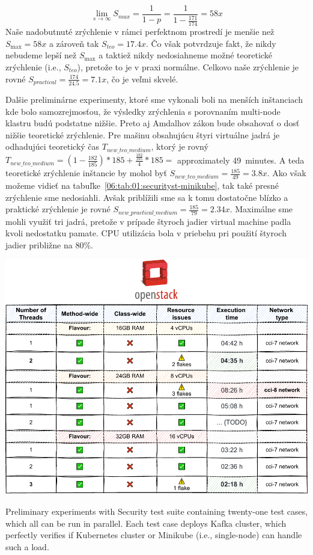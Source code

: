 \begin{equation}
    \label{eqn:amdalh-limit}
    \lim_{s\to\infty} S_{max} = \frac{1}{1-p} =  \frac{1}{1-\frac{171}{174}} = 58x
    \tag{8}
\end{equation}
Naše nadobutnuté zrýchlenie v rámci perfektnom prostredí je menšie než $S_{\max} = 58x$ a zároveň tak $S_{teo} = 17.4x$.
Čo však potvrdzuje fakt, že nikdy nebudeme lepší než $S_{\max}$ a taktiež nikdy nedosiahneme možné teoretické zrýchlenie (i.e., $S_{teo}$),
pretože to je v praxi normálne. Celkovo naše zrýchlenie je rovné $S_{practical} = \frac{174}{24.5} =7.1x$, čo je veľmi skvelé.

Dalšie preliminárne experimenty, ktoré sme vykonali boli na menších inštanciach kde bolo samozrejmosťou, že výsledky
zrýchlenia s porovnaním multi-node klastru budú podstatne nižšie.
Preto aj Amdalhov zákon bude obsahovať o dosť nižšie teoretické zrýchlenie. Pre mašinu obsahujúcu štyri virtuálne jadrá je
odhadujúci teoretický čas $T_{new\_teo\_medium}$, ktorý je rovný $T_{new\_teo\_medium} = (1 - \frac{182}{185}) * 185 +  \frac{ \frac{182}{185}}{4} * 185 = $ approximately 49~minutes.
A teda teoretické zrýchlenie inštancie by mohol byť $S_{new\_teo\_medium} = \frac{185}{49} = 3.8x$.
Ako však možeme vidieť na tabuľke~\ref{06:tab:01:securityst-minikube}, tak také presné zrýchlenie sme nedosiahli.
Avšak priblížili sme sa k tomu dostatočne blízko a praktické zrýchlenie je rovné $S_{new\_practical\_medium} = \frac{185}{79} = 2.34x$.
Maximálne sme mohli využiť tri jadrá, pretože v prípade štyroch jadier virtual machine padla kvoli nedostatku pamate.
CPU utilizácia bola v priebehu pri použití štyroch jadier približne na 80\%.

\begin{table}[ht!]
    \centering
    \includegraphics[scale=0.8]{obrazky-figures/08-experiments/06-exp-a-prelim}
    \caption{Preliminary experiments with Security test suite containing twenty-one test cases, which all can be run in parallel.
    Each test case deploys Kafka cluster, which perfectly verifies if Kubernetes cluster or Minikube (i.e., single-node) can handle such a load.}
    \label{06:tab:01:securityst-minikube}
\end{table}

